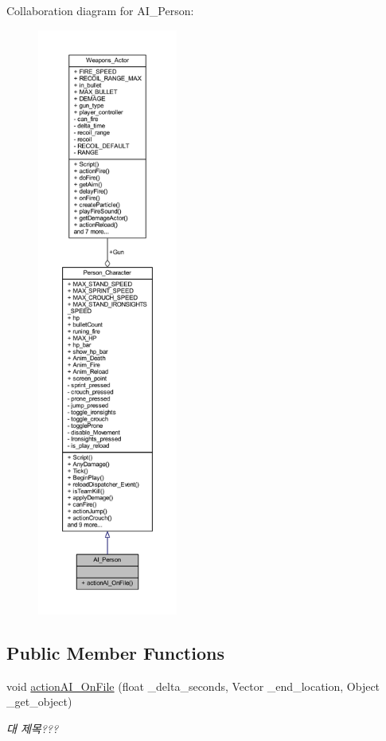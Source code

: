 Collaboration diagram for A\+I\+\_\+\+Person\+:\nopagebreak
\begin{figure}[H]
\begin{center}
\leavevmode
\includegraphics[height=550pt]{class_a_i___person__coll__graph}
\end{center}
\end{figure}
\subsection*{Public Member Functions}
\begin{DoxyCompactItemize}
\item 
void \hyperlink{class_a_i___person_aa6625ce68ebad8cdc678c872f41b5944}{action\+A\+I\+\_\+\+On\+File} (float \+\_\+delta\+\_\+seconds, Vector \+\_\+end\+\_\+location, Object \+\_\+get\+\_\+object)
\begin{DoxyCompactList}\small\item\em 대 제목??? \end{DoxyCompactList}\end{DoxyCompactItemize}
